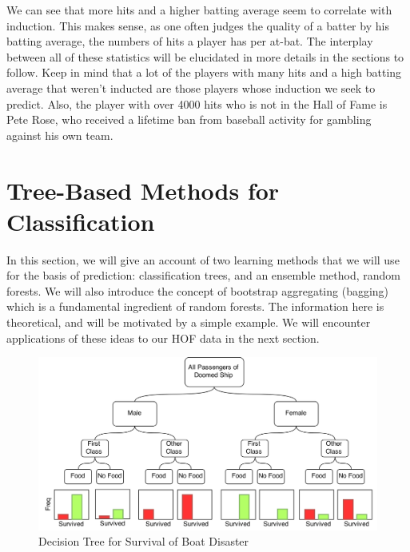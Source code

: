 \documentclass[preprint,12pt]{elsarticle}
\begin{document}
We can see that more hits and a higher batting average seem to correlate with induction. This makes sense, as one often judges the quality of a batter by his batting average, the numbers of hits a player has per at-bat. The interplay between all of these statistics will be elucidated in more details in the sections to follow. Keep in mind that a lot of the players with many hits and a high batting average that weren't inducted are those players whose induction we seek to predict. Also, the player with over 4000 hits who is not in the Hall of Fame is Pete Rose, who received a lifetime ban from baseball activity for gambling against his own team.







\section{Tree-Based Methods for Classification}
\label{method}

In this section, we will give an account of two learning methods that we will use for the basis of prediction: classification trees, and an ensemble method, random forests. We will also introduce the concept of bootstrap aggregating (bagging) which is a fundamental ingredient of random forests. The information here is theoretical, and will be motivated by a simple example. We will encounter applications of these ideas to our HOF data in the next section.
\begin{figure}[h]
	\centering
	\includegraphics[width=1\textwidth]{TreeExample}
	\caption{Decision Tree for Survival of Boat Disaster}
	\label{fig:SampleTree}
\end{figure}
\end{document}
